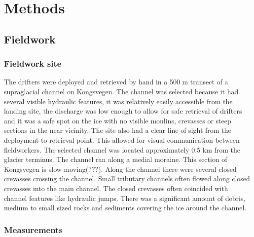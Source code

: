 \chapter{Methods}
\label{sec:methods}
\section{Fieldwork}
\subsection{Fieldwork site}
The drifters were deployed and retrieved by hand in a 500 m transect of a supraglacial channel on Kongsvegen. The channel was selected because it had several visible hydraulic features, it was relatively easily accessible from the landing site, the discharge was low enough to allow for safe retrieval of drifters and it was a safe spot on the ice with no visible moulins, crevasses or steep sections in the near vicinity. The site also had a clear line of sight from the deployment to retrieval point. This allowed for visual communication between fieldworkers.
\newline
\newline
The selected channel was located approximately 0.5 km from the glacier terminus. The channel ran along a medial moraine. This section of Kongsvegen is slow moving(???). Along the channel there were several closed crevasses crossing the channel. Small tributary channels often flowed along closed crevasses into the main channel. The closed crevasses often coincided with channel features like hydraulic jumps. There was a significant amount of debris, medium to small sized rocks and sediments covering the ice around the channel. 

\subsection{Measurements}
